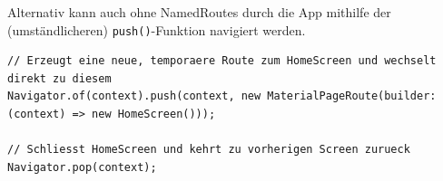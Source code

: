 Alternativ kann auch ohne NamedRoutes durch die App mithilfe der (umständlicheren) \lstinline{push()}-Funktion navigiert 
werden.

\begin{lstlisting}
// Erzeugt eine neue, temporaere Route zum HomeScreen und wechselt direkt zu diesem
Navigator.of(context).push(context, new MaterialPageRoute(builder: (context) => new HomeScreen()));

// Schliesst HomeScreen und kehrt zu vorherigen Screen zurueck
Navigator.pop(context);
\end{lstlisting}